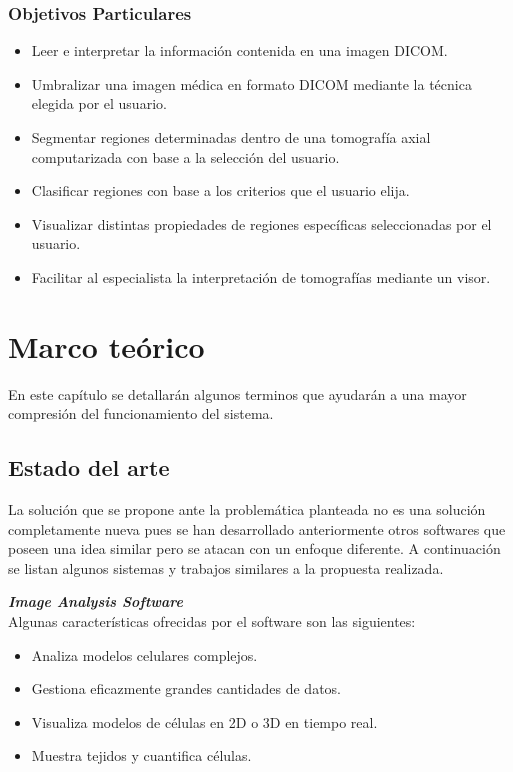 \documentclass[12pt]{report}
\begin{document}
\subsection{Objetivos Particulares}
\begin{itemize}
\item Leer e interpretar la información contenida en una imagen DICOM.
\item Umbralizar una imagen médica en formato DICOM mediante la técnica elegida por el usuario.
\item Segmentar regiones determinadas dentro de una tomografía axial computarizada con base a la selección del usuario.
\item Clasificar regiones con base a los criterios que el usuario elija.
\item Visualizar distintas propiedades de regiones específicas seleccionadas por el usuario.
\item Facilitar al especialista la interpretación de tomografías mediante un visor.
\end{itemize}


\chapter{Marco teórico}
En este capítulo se detallarán algunos terminos que ayudarán a una mayor compresión del funcionamiento del sistema.
\section{Estado del arte}
La solución que se propone ante la problemática planteada no es una solución completamente nueva pues se han desarrollado anteriormente otros softwares que poseen una idea similar pero se atacan con un enfoque diferente. A continuación se listan algunos sistemas y trabajos similares a la propuesta realizada.

\hfill\break
\textbf{\textit{Image Analysis Software}}\cite{ims}
\\Algunas características ofrecidas por el software son las siguientes:
\begin{itemize}
\item Analiza modelos celulares complejos.
\item Gestiona eficazmente grandes cantidades de datos.
\item Visualiza modelos de células en 2D o 3D en tiempo real.
\item Muestra tejidos y cuantifica células.
\end{itemize}
\end{document}

